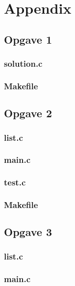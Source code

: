 \section{Appendix}

\subsection*{Opgave 1}
\subsubsection*{solution.c}

\subsubsection*{Makefile}


\subsection*{Opgave 2}
\subsubsection*{list.c}

\subsubsection*{main.c}

\subsubsection*{test.c}

\subsubsection*{Makefile}


\subsection*{Opgave 3}
\subsubsection*{list.c}

\subsubsection*{main.c}

